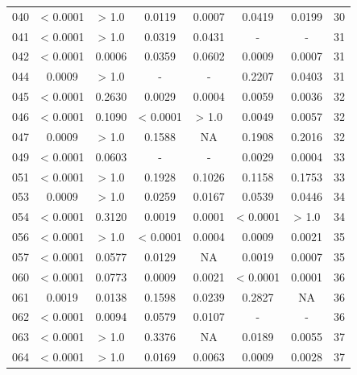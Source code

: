{\begin{longtable}{cccccccc}
040 & {\color{red} < 0.0001} & > 1.0 & {\color{red}0.0119} & {\color{red}0.0007} & {\color{red}0.0419} & {\color{red}0.0199} & 30 \\
041 & {\color{red} < 0.0001} & > 1.0 & {\color{red}0.0319} & {\color{red}0.0431} & - & - &  31 \\
042 & {\color{red} < 0.0001} & {\color{red}0.0006} & {\color{red}0.0359} & 0.0602 & {\color{red}0.0009} & {\color{red}0.0007} & 31 \\
044 & {\color{red}0.0009} & > 1.0 & - & - &  0.2207 & {\color{red}0.0403} & 31 \\
045 & {\color{red} < 0.0001} & 0.2630 & {\color{red}0.0029} & {\color{red}0.0004} & {\color{red}0.0059} & {\color{red}0.0036} & 32 \\
046 & {\color{red} < 0.0001} & 0.1090 & {\color{red} < 0.0001} & > 1.0 & {\color{red}0.0049} & {\color{red}0.0057} & 32 \\
047 & {\color{red}0.0009} & > 1.0 & 0.1588 & NA & 0.1908 & 0.2016 & 32 \\
049 & {\color{red} < 0.0001} & 0.0603 & - & - &  {\color{red}0.0029} & {\color{red}0.0004} & 33 \\
051 & {\color{red} < 0.0001} & > 1.0 & 0.1928 & 0.1026 & 0.1158 & 0.1753 & 33 \\
053 & {\color{red}0.0009} & > 1.0 & {\color{red}0.0259} & {\color{red}0.0167} & 0.0539 & {\color{red}0.0446} & 34 \\
054 & {\color{red} < 0.0001} & 0.3120 & {\color{red}0.0019} & {\color{red}0.0001} & {\color{red} < 0.0001} & > 1.0 & 34 \\
056 & {\color{red} < 0.0001} & > 1.0 & {\color{red} < 0.0001} & {\color{red}0.0004} & {\color{red}0.0009} & {\color{red}0.0021} & 35 \\
057 & {\color{red} < 0.0001} & 0.0577 & {\color{red}0.0129} & NA & {\color{red}0.0019} & {\color{red}0.0007} & 35 \\
060 & {\color{red} < 0.0001} & 0.0773 & {\color{red}0.0009} & {\color{red}0.0021} & {\color{red} < 0.0001} & {\color{red}0.0001} & 36 \\
061 & {\color{red}0.0019} & {\color{red}0.0138} & 0.1598 & {\color{red}0.0239} & 0.2827 & NA & 36 \\
062 & {\color{red} < 0.0001} & {\color{red}0.0094} & 0.0579 & {\color{red}0.0107} & - & - &  36 \\
063 & {\color{red} < 0.0001} & > 1.0 & 0.3376 & NA & {\color{red}0.0189} & {\color{red}0.0055} & 37 \\
064 & {\color{red} < 0.0001} & > 1.0 & {\color{red}0.0169} & {\color{red}0.0063} & {\color{red}0.0009} & {\color{red}0.0028} & 37 \\

\end{longtable}}
